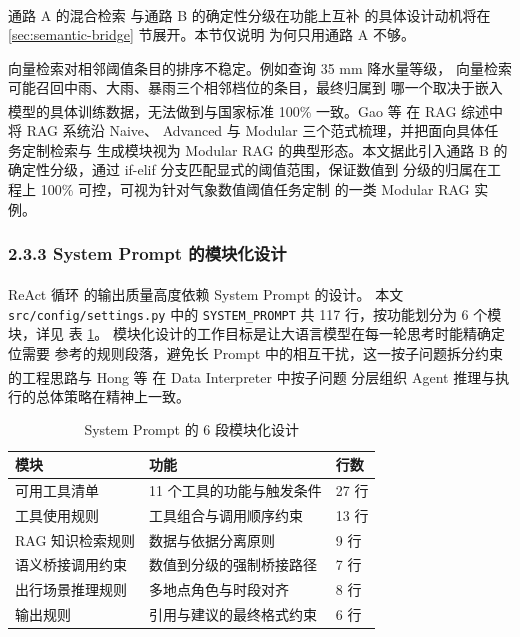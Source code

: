 \documentclass[a4paper]{article}
\newcommand{\song}{\CJKfamily{song}}
\theoremstyle{definition}
\theoremstyle{plain}
\theoremstyle{remark}
\newcommand{\reftab}[1]{表 \ref{#1}}
\let\oldcite\cite
\renewcommand{\cite}[1]{\textsuperscript{\oldcite{#1}}}
\newcommand{\bk}{\discretionary{}{}{}}
\begin{document}
通路 A 的混合检索 \cite{ref12} 与通路 B 的确定性分级在功能上互补
的具体设计动机将在 \ref{sec:semantic-bridge} 节展开。本节仅说明
为何只用通路 A 不够。

向量检索对相邻阈值条目的排序不稳定。例如查询 35 mm 降水量等级，
向量检索可能召回中雨、大雨、暴雨三个相邻档位的条目，最终归属到
哪一个取决于嵌入模型的具体训练数据，无法做到与国家标准 100\%
一致。Gao 等 \cite{ref24} 在 RAG 综述中将 RAG 系统沿 Naive、
Advanced 与 Modular 三个范式梳理，并把面向具体任务定制检索与
生成模块视为 Modular RAG 的典型形态。本文据此引入通路 B 的
确定性分级，通过 if-elif 分支匹配显式的阈值范围，保证数值到
分级的归属在工程上 100\% 可控，可视为针对气象数值阈值任务定制
的一类 Modular RAG 实例。

\subsubsection*{2.3.3 \quad System Prompt 的模块化设计}

ReAct 循环 \cite{ref18} 的输出质量高度依赖 System Prompt 的设计。
本文 \texttt{src/\bk{}config/\bk{}settings.\bk{}py} 中的 \texttt{SYSTEM\_\bk{}PROMPT}
共 117 行，按功能划分为 6 个模块，详见 \reftab{tab:prompt-modules}。
模块化设计的工作目标是让大语言模型在每一轮思考时能精确定位需要
参考的规则段落，避免长 Prompt 中的相互干扰，这一按子问题拆分约束
的工程思路与 Hong 等 \cite{ref20} 在 Data Interpreter 中按子问题
分层组织 Agent 推理与执行的总体策略在精神上一致。

\begin{table}[!ht]
    \centering
    \caption{System Prompt 的 6 段模块化设计}
    \label{tab:prompt-modules}
    \song\fontsize{9pt}{12pt}\selectfont
    \renewcommand{\arraystretch}{0.95}
    \begin{tabular}{lll}
        \toprule
        模块 & 功能 & 行数 \\
        \midrule
        可用工具清单 & 11 个工具的功能与触发条件 & 27 行 \\
        工具使用规则 & 工具组合与调用顺序约束 & 13 行 \\
        RAG 知识检索规则 & 数据与依据分离原则 & 9 行 \\
        语义桥接调用约束 & 数值到分级的强制桥接路径 & 7 行 \\
        出行场景推理规则 & 多地点角色与时段对齐 & 8 行 \\
        输出规则 & 引用与建议的最终格式约束 & 6 行 \\
        \bottomrule
    \end{tabular}
\end{table}
\end{document}
